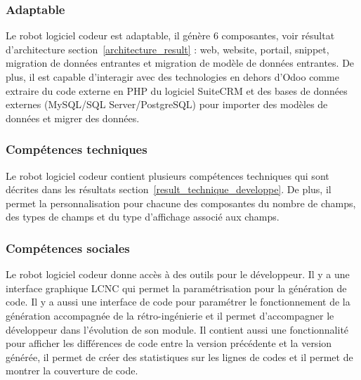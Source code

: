 \subsubsection{Adaptable}
Le robot logiciel codeur est adaptable, il génère 6 composantes, voir résultat d'architecture section~\ref{architecture_result} : web, website, portail, snippet, migration de données entrantes et migration de modèle de données entrantes. De plus, il est capable d'interagir avec des technologies en dehors d'Odoo comme extraire du code externe en PHP du logiciel SuiteCRM et des bases de données externes (MySQL/SQL Server/PostgreSQL) pour importer des modèles de données et migrer des données.


\subsubsection{Compétences techniques}
Le robot logiciel codeur contient plusieurs compétences techniques qui sont décrites dans les résultats section~\ref{result_technique_developpe}. De plus, il permet la personnalisation pour chacune des composantes du nombre de champs, des types de champs et du type d'affichage associé aux champs.


\subsubsection{Compétences sociales}
Le robot logiciel codeur donne accès à des outils pour le développeur. Il y a une interface graphique LCNC qui permet la paramétrisation pour la génération de code. Il y a aussi une interface de code pour paramétrer le fonctionnement de la génération accompagnée de la rétro-ingénierie et il permet d'accompagner le développeur dans l'évolution de son module. Il contient aussi une fonctionnalité pour afficher les différences de code entre la version précédente et la version générée, il permet de créer des statistiques sur les lignes de codes et il permet de montrer la couverture de code.




